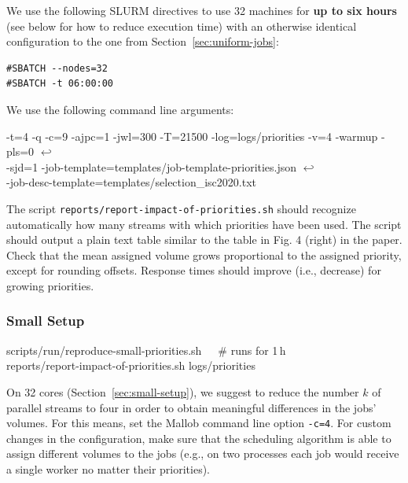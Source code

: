 \documentclass[runningheads]{article}
\newcommand{\CR}{{\tiny$\hookleftarrow$}}
\numberwithin{dummy}{subsection}
\begin{document}
We use the following SLURM directives to use 32 machines for \textbf{up to six hours} (see below for how to reduce execution time) with an otherwise identical configuration to the one from Section~\ref{sec:uniform-jobs}:

\begin{verbatim}
#SBATCH --nodes=32
#SBATCH -t 06:00:00
\end{verbatim}

We use the following command line arguments:

\begin{ttfenv}
-t=4 -q -c=9 -ajpc=1 -jwl=300 -T=21500 -log=logs/priorities -v=4 -warmup -pls=0 \CR\\
-sjd=1 -job-template=templates/job-template-priorities.json \CR\\
 -job-desc-template=templates/selection\_isc2020.txt
\end{ttfenv}

The script \texttt{reports/report-impact-of-priorities.sh} should recognize automatically how many streams with which priorities have been used.
The script should output a plain text table similar to the table in Fig. 4 (right) in the paper.
Check that the mean assigned volume grows proportional to the assigned priority, except for rounding offsets.
Response times should improve (i.e., decrease) for growing priorities.

\subsubsection{Small Setup}

\begin{tcolorbox}[
  colback=Magenta!5!white,
  colframe=Magenta!75!black,
  title={\centering Commands for Small Setup (Section~\ref{sec:small-setup}) in a Nutshell}]
\begin{ttfenvcompact}
scripts/run/reproduce-small-priorities.sh\ \ \ \# runs for 1\,h\\
reports/report-impact-of-priorities.sh logs/priorities
\end{ttfenvcompact}
\end{tcolorbox}

On 32 cores (Section~\ref{sec:small-setup}), we suggest to reduce the number $k$ of parallel streams to four in order to obtain meaningful differences in the jobs' volumes.
For this means, set the Mallob command line option \texttt{-c=4}.
For custom changes in the configuration, make sure that the scheduling algorithm is able to assign different volumes to the jobs (e.g., on two processes each job would receive a single worker no matter their priorities).
\end{document}

